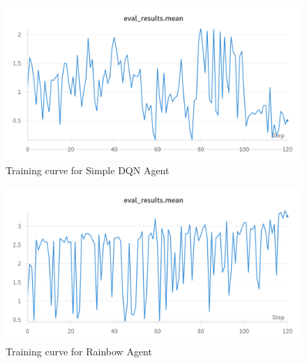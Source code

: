 \begin{figure}[h]
 
  \centering
  \includegraphics[width=\linewidth]{results/IQL.png}
  \caption{
    Training curve for Simple DQN Agent
  }
  \label{fig:dqn}
\end{figure}

\begin{figure}[h]
  \centering
  \includegraphics[width=\linewidth]{results/RAINBOW-mean.png}
  \caption{
    Training curve for Rainbow Agent
  }
  \label{fig:rainbow}
\end{figure}




